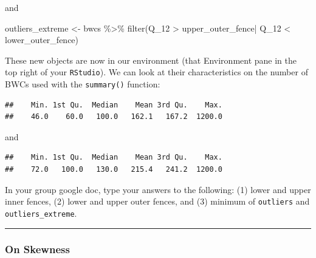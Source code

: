 \documentclass[
]{book}
\newenvironment{Shaded}{\begin{snugshade}}{\end{snugshade}}
\newcommand{\FunctionTok}[1]{\textcolor[rgb]{0.00,0.00,0.00}{#1}}
\newcommand{\NormalTok}[1]{#1}
\newcommand{\OtherTok}[1]{\textcolor[rgb]{0.56,0.35,0.01}{#1}}
\newcommand{\SpecialCharTok}[1]{\textcolor[rgb]{0.00,0.00,0.00}{#1}}
\begin{document}
and

\begin{Shaded}
\begin{Highlighting}[]
\NormalTok{outliers\_extreme }\OtherTok{\textless{}{-}}\NormalTok{ bwcs }\SpecialCharTok{\%\textgreater{}\%} 
  \FunctionTok{filter}\NormalTok{(Q\_12 }\SpecialCharTok{\textgreater{}}\NormalTok{ upper\_outer\_fence}\SpecialCharTok{|}\NormalTok{ Q\_12 }\SpecialCharTok{\textless{}}\NormalTok{ lower\_outer\_fence)}
\end{Highlighting}
\end{Shaded}

These new objects are now in our environment (that Environment pane in the top right of your \texttt{RStudio}). We can look at their characteristics on the number of BWCs used with the \texttt{summary()} function:

\begin{Shaded}
\end{Shaded}

\begin{verbatim}
##    Min. 1st Qu.  Median    Mean 3rd Qu.    Max. 
##    46.0    60.0   100.0   162.1   167.2  1200.0
\end{verbatim}

and

\begin{Shaded}
\end{Shaded}

\begin{verbatim}
##    Min. 1st Qu.  Median    Mean 3rd Qu.    Max. 
##    72.0   100.0   130.0   215.4   241.2  1200.0
\end{verbatim}

In your group google doc, type your answers to the following: (1) lower and upper inner fences, (2) lower and upper outer fences, and (3) minimum of \texttt{outliers} and \texttt{outliers\_extreme}.

\begin{center}\rule{0.5\linewidth}{0.5pt}\end{center}

\hypertarget{on-skewness}{%
\subsubsection{\texorpdfstring{\textbf{On Skewness}}{On Skewness}}\label{on-skewness}}
\end{document}
